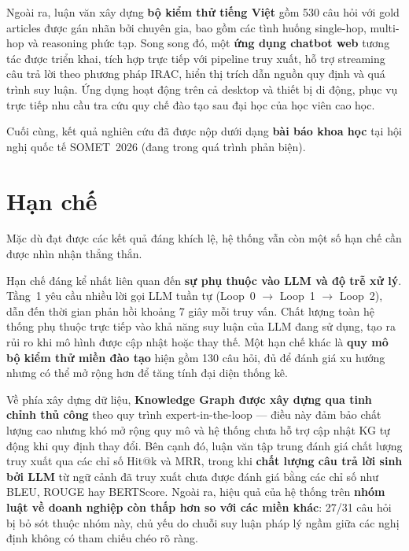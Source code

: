 Ngoài ra, luận văn xây dựng \textbf{bộ kiểm thử tiếng Việt} gồm 530 câu hỏi với gold articles được gán nhãn bởi chuyên gia, bao gồm các tình huống single-hop, multi-hop và reasoning phức tạp. Song song đó, một \textbf{ứng dụng chatbot web} tương tác được triển khai, tích hợp trực tiếp với pipeline truy xuất, hỗ trợ streaming câu trả lời theo phương pháp IRAC, hiển thị trích dẫn nguồn quy định và quá trình suy luận. Ứng dụng hoạt động trên cả desktop và thiết bị di động, phục vụ trực tiếp nhu cầu tra cứu quy chế đào tạo sau đại học của học viên cao học.

Cuối cùng, kết quả nghiên cứu đã được nộp dưới dạng \textbf{bài báo khoa học} tại hội nghị quốc tế SOMET~2026 (đang trong quá trình phản biện).

\section{Hạn chế}
\label{sec:han-che}

Mặc dù đạt được các kết quả đáng khích lệ, hệ thống vẫn còn một số hạn chế cần được nhìn nhận thẳng thắn.

Hạn chế đáng kể nhất liên quan đến \textbf{sự phụ thuộc vào LLM và độ trễ xử lý}. Tầng~1 yêu cầu nhiều lời gọi LLM tuần tự (Loop~0 $\to$ Loop~1 $\to$ Loop~2), dẫn đến thời gian phản hồi khoảng 7 giây mỗi truy vấn. Chất lượng toàn hệ thống phụ thuộc trực tiếp vào khả năng suy luận của LLM đang sử dụng, tạo ra rủi ro khi mô hình được cập nhật hoặc thay thế. Một hạn chế khác là \textbf{quy mô bộ kiểm thử miền đào tạo} hiện gồm 130 câu hỏi, đủ để đánh giá xu hướng nhưng có thể mở rộng hơn để tăng tính đại diện thống kê.

Về phía xây dựng dữ liệu, \textbf{Knowledge Graph được xây dựng qua tinh chỉnh thủ công} theo quy trình expert-in-the-loop — điều này đảm bảo chất lượng cao nhưng khó mở rộng quy mô và hệ thống chưa hỗ trợ cập nhật KG tự động khi quy định thay đổi. Bên cạnh đó, luận văn tập trung đánh giá chất lượng truy xuất qua các chỉ số Hit@k và MRR, trong khi \textbf{chất lượng câu trả lời sinh bởi LLM} từ ngữ cảnh đã truy xuất chưa được đánh giá bằng các chỉ số như BLEU, ROUGE hay BERTScore. Ngoài ra, hiệu quả của hệ thống trên \textbf{nhóm luật về doanh nghiệp còn thấp hơn so với các miền khác}: 27/31 câu hỏi bị bỏ sót thuộc nhóm này, chủ yếu do chuỗi suy luận pháp lý ngầm giữa các nghị định không có tham chiếu chéo rõ ràng.

